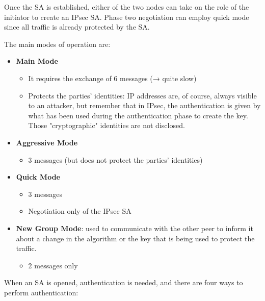 Once the SA is established, either of the two nodes can take on the role of the initiator to create an IPsec SA. Phase two negotiation can employ quick mode since all traffic is already protected by the SA.

The main modes of operation are:

\begin{itemize}
	\item \textbf{Main Mode}
	      \begin{itemize}
		      \item It requires the exchange of 6 messages (→ quite slow)
		      \item Protects the parties' identities: IP addresses are, of course, always visible to an attacker, but remember that in IPsec, the authentication is given by what has been used during the authentication phase to create the key. Those "cryptographic" identities are not disclosed.
	      \end{itemize}

	\item \textbf{Aggressive Mode}
	      \begin{itemize}
		      \item 3 messages (but does not protect the parties' identities)
	      \end{itemize}

	\item \textbf{Quick Mode}
	      \begin{itemize}
		      \item 3 messages
		      \item Negotiation only of the IPsec SA
	      \end{itemize}

	\item \textbf{New Group Mode}: used to communicate with the other peer to inform it about a change in the algorithm or the key that is being used to protect the traffic.
	      \begin{itemize}
		      \item 2 messages only
	      \end{itemize}
\end{itemize}

When an SA is opened, authentication is needed, and there are four ways to perform authentication:

